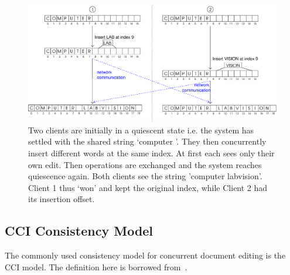 \documentclass[12pt,a4paper,twoside,openright]{report}
\begin{document}
	\begin{figure}[htb]
	\centering
	\includegraphics[width=1\linewidth]{figs/reconcile.eps}
	\caption[Achieving Conflict Free Text Editing]{Two clients are initially in a quiescent state i.e. the system has settled with the shared string `computer '. They then concurrently insert different words at the same index. At first each sees only their own edit. Then operations are exchanged and the system reaches quiescence again. Both clients see the string 'computer labvision'. Client 1 thus `won' and kept the original index, while Client 2 had its insertion offset.}
	\label{fig:reconcile}
	\end{figure}
	
	\subsection{CCI Consistency Model} 	\label{sec:cciconsistency}
	The commonly used consistency model for concurrent document editing is the CCI model. The definition here is borrowed from~\cite{weiss2010undo}.
	
\end{document}
